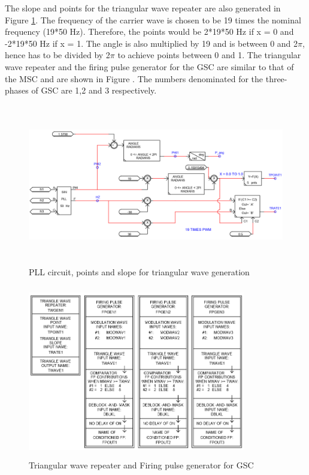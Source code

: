 The slope and points for the triangular wave repeater are also generated in Figure \ref{fig:PLL_model}. The frequency of the carrier wave is chosen to be 19 times the nominal frequency (19*50 Hz). Therefore, the points would be 2*19*50 Hz if x = 0 and -2*19*50 Hz if x = 1. The angle is also multiplied by 19 and is between 0 and 2$\pi$, hence has to be divided by 2$\pi$ to achieve points between 0 and 1. The triangular wave repeater and the firing pulse generator for the \gls{GSC} are similar to that of the \gls{MSC} and are shown in Figure . The numbers denominated for the three-phases of \gls{GSC} are 1,2 and 3 respectively.


\begin{figure}[H]
\centering
    \includegraphics[height = 7cm,width = 15.5cm]{Diagrams/Appendix_A/PLL_model.PNG}
    \caption{PLL circuit, points and slope for triangular wave generation}
    \label{fig:PLL_model}
\end{figure}

\begin{figure}[H]
\centering
    \includegraphics[height = 7.5cm,width = 9.5cm]{Diagrams/Appendix_A/Firing_blocks_GSC.PNG}
    \caption{Triangular wave repeater and Firing pulse generator for GSC}
    \label{fig:Firing_blocks_GSC}
\end{figure}

